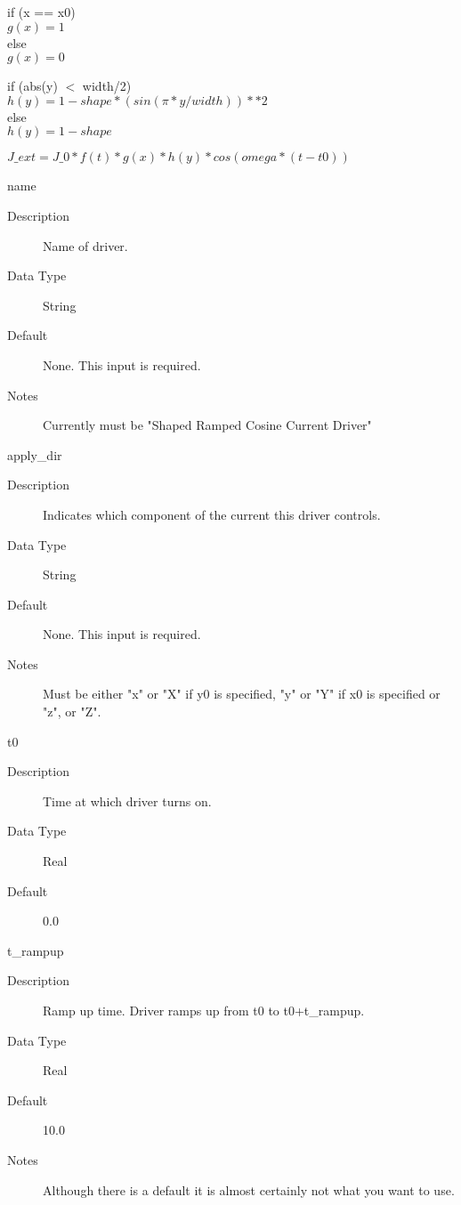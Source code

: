 \documentclass[11pt]{amsart}
\begin{document}
\noindent if (x == x0) \\
\indent \begin{math} g(x) = 1 \end{math} \\
else \\
\indent \begin{math} g(x) = 0 \end{math}

\noindent if (abs(y) $<$ width/2) \\
\indent \begin{math} h(y) = 1-shape*(sin(\pi*y/width))**2 \end{math} \\
else \\
\indent \begin{math} h(y) = 1-shape \end{math}

\noindent \begin{math} J\_ext = J\_0*f(t)*g(x)*h(y)*cos(omega*(t-t0)) \end{math}

name
\begin{description}
\item [Description] Name of driver.
\item [Data Type] String
\item [Default] None.  This input is required.
\item [Notes] Currently must be "Shaped Ramped Cosine Current Driver"
\end{description}

apply\_dir
\begin{description}
\item [Description] Indicates which component of the current this driver
controls.
\item [Data Type] String
\item [Default] None.  This input is required.
\item [Notes] Must be either "x" or "X" if y0 is specified, "y" or "Y" if x0
is specified or "z", or "Z".
\end{description}

t0
\begin{description}
\item [Description] Time at which driver turns on.
\item [Data Type] Real
\item [Default] 0.0
\end{description}

t\_rampup
\begin{description}
\item [Description] Ramp up time.  Driver ramps up from t0 to t0+t\_rampup.
\item [Data Type] Real
\item [Default] 10.0
\item [Notes] Although there is a default it is almost certainly not what you
want to use.
\end{description}
\end{document}
